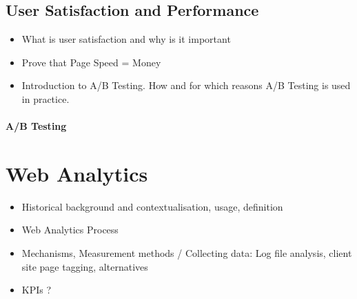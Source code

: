 

\subsection{User Satisfaction and Performance}

\begin{itemize}
\item What is user satisfaction and why is it important
\item Prove that Page Speed = Money
\item Introduction to A/B Testing. How and for which reasons A/B Testing is used in practice.
\end{itemize}





\paragraph{A/B Testing}










\section{Web Analytics}

\begin{itemize}
\item Historical background and contextualisation, usage, definition
\item Web Analytics Process
\item Mechanisms, Measurement methods / Collecting data: Log file analysis, client site page tagging, alternatives
\item KPIs ?
\end{itemize}



